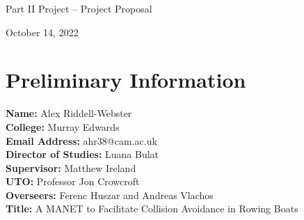 \documentclass[10pt, a4paper]{article}
\begin{document}
\begin{center}
\Huge{Part II Project -- Project Proposal} \par
\Large{October 14, 2022} \par
\end{center}
\par
\par

\section*{Preliminary Information}
\textbf{Name:} Alex Riddell-Webster \\
\textbf{College:} Murray Edwards \\
\textbf{Email Address:} ahr38@cam.ac.uk \\
\textbf{Director of Studies:} Luana Bulat \\
\textbf{Supervisor:} Matthew Ireland \\
\textbf{UTO:} Professor Jon Crowcroft\\
\textbf{Overseers:}  Ferenc Huszar and Andreas Vlachos \\
\textbf{Title:} A MANET to Facilitate Collision Avoidance in Rowing Boats
\end{document}
